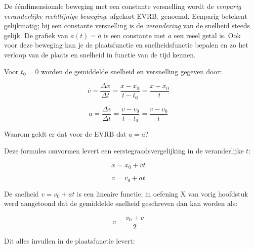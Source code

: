 \documentclass{ximera}
\begin{document}
	\author{Bart Lambregs}
    \xmsource\xmuitleg



De ééndimensionale beweging met een constante  versnelling wordt de \textit{eenparig veranderlijke rechtlijnige beweging}, afgekort EVRB, genoemd. 
Eenparig betekent gelijkmatig; bij een constante versnelling is de \textit{verandering} van de snelheid steeds gelijk.
De grafiek van $a(t)=a$ is een constante met $a$ een reëel getal is.
Ook voor deze beweging kan je de plaatsfunctie en snelheidsfunctie bepalen en zo het verloop van de plaats en snelheid in functie van de tijd kennen. 




Voor \(t_0 = 0\) worden de gemiddelde snelheid en versnelling gegeven door: 

\[
\bar{v} = \frac{\Delta x}{\Delta t} = \frac{x - x_0}{t - t_0} = \frac{x - x_0}{t}
\]

\[
a = \frac{\Delta v}{\Delta t} = \frac{v - v_0}{t - t_0} = \frac{v - v_0}{t}
\]


\begin{quickquestion*}{}{}
Waarom geldt er dat voor de EVRB dat \( \overline{a} = a\)? 
\end{quickquestion*}

Deze formules omvormen levert een eerstegraadsvergelijking in de veranderlijke \(t\): 

\[
x = x_0 + \bar{v}t 
\]

\[
v = v_0 + at 
\]


De snelheid \(v = v_0 + at \) is een lineaire functie, in oefening X van vorig hoofdstuk werd aangetoond dat de gemiddelde snelheid geschreven dan kan worden als: 

\[
\bar{v} = \frac{v_0 + v}{2} 
\]



Dit alles invullen in de plaatsfunctie levert: 
\end{document}
